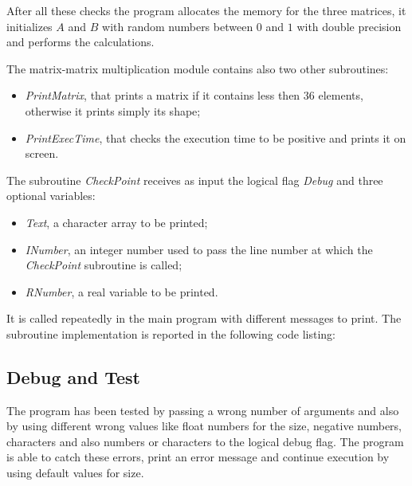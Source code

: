 \documentclass[11pt,a4paper]{article}
\begin{document}
After all these checks the program allocates the memory for the three matrices, it initializes $A$ and $B$ with random numbers between $0$ and $1$ with double precision and performs the calculations.

The matrix-matrix multiplication module contains also two other subroutines:
\begin{itemize}
	\item \textit{PrintMatrix}, that prints a matrix if it contains less then $36$ elements, otherwise it prints simply its shape;
	\item \textit{PrintExecTime}, that checks the execution time to be positive and prints it on screen.
\end{itemize}

The subroutine \textit{CheckPoint} receives as input the logical flag \textit{Debug} and three optional variables:
\begin{itemize}
	\item \textit{Text}, a character array to be printed;
	\item \textit{INumber}, an integer number used to pass the line number at which the \textit{CheckPoint} subroutine is called;
	\item \textit{RNumber}, a real variable to be printed.
\end{itemize}
It is called repeatedly in the main program with different messages to print.
The subroutine implementation is reported in the following code listing:


\subsection{Debug and Test}

The program has been tested by passing a wrong number of arguments and also by using different wrong values like float numbers for the size, negative numbers, characters and also numbers or characters to the logical debug flag. The program is able to catch these errors, print an error message and continue execution by using default values for size.
\end{document}
